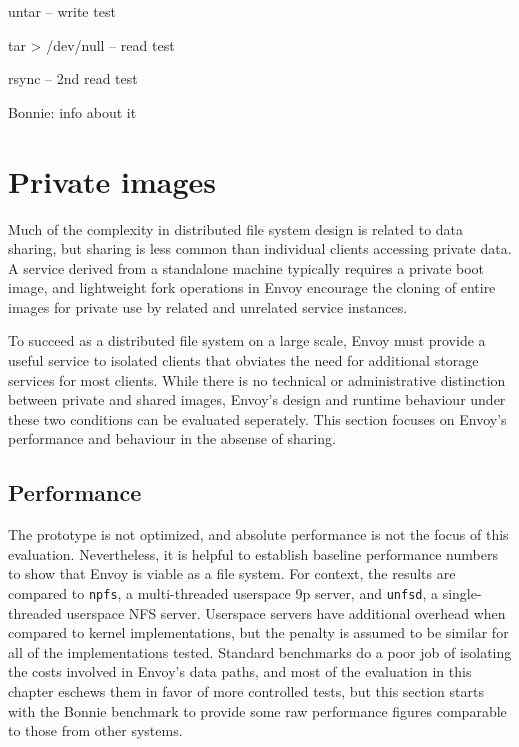 untar -- write test

tar > /dev/null -- read test

rsync -- 2nd read test

Bonnie: info about it

\section{Private images}

Much of the complexity in distributed file system design is related to data sharing, but sharing is less common than individual clients accessing private data. A service derived from a standalone machine typically requires a private boot image, and lightweight fork operations in Envoy encourage the cloning of entire images for private use by related and unrelated service instances.

To succeed as a distributed file system on a large scale, Envoy must provide a useful service to isolated clients that obviates the need for additional storage services for most clients. While there is no technical or administrative distinction between private and shared images, Envoy's design and runtime behaviour under these two conditions can be evaluated seperately. This section focuses on Envoy's performance and behaviour in the absense of sharing.

\subsection{Performance}

The prototype is not optimized, and absolute performance is not the focus of this evaluation. Nevertheless, it is helpful to establish baseline performance numbers to show that Envoy is viable as a file system. For context, the results are compared to \texttt{npfs}, a multi-threaded userspace 9p server, and \texttt{unfsd}, a single-threaded userspace NFS server. Userspace servers have additional overhead when compared to kernel implementations, but the penalty is assumed to be similar for all of the implementations tested. Standard benchmarks do a poor job of isolating the costs involved in Envoy's data paths, and most of the evaluation in this chapter eschews them in favor of more controlled tests, but this section starts with the Bonnie benchmark to provide some raw performance figures comparable to those from other systems.

